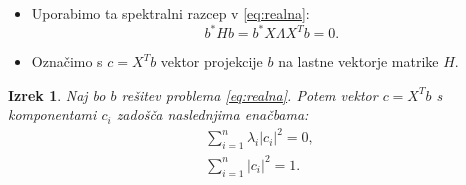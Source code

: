 \documentclass{beamer}
\newcommand{\abs}[1]{ \left\lvert#1\right\rvert}
\newtheorem{izrek}{Izrek}
\begin{document}
\begin{frame}
\begin{itemize}
\item Uporabimo ta spektralni razcep v \eqref{eq:realna}: $$b^\ast Hb=b^\ast X\Lambda X^T b=0.$$ 
\item  Označimo s $c=X^Tb$ vektor projekcije $b$ na lastne vektorje matrike $H$. 
\end{itemize}\pause
\begin{izrek} \label{izrek2}
Naj bo $b$ rešitev problema \eqref{eq:realna}. Potem vektor $c=X^T b$ s komponentami $c_i$ zadošča naslednjima enačbama:
\begin{align}
\sum_{i=1}^{n} \lambda_i \abs{c_i}^2=0 \label{eq:en1},\\
\sum_{i=1}^{n}\abs{c_i}^2=1. \label{eq:en2}
\end{align}
\end{izrek}
\end{frame}
\end{document}

